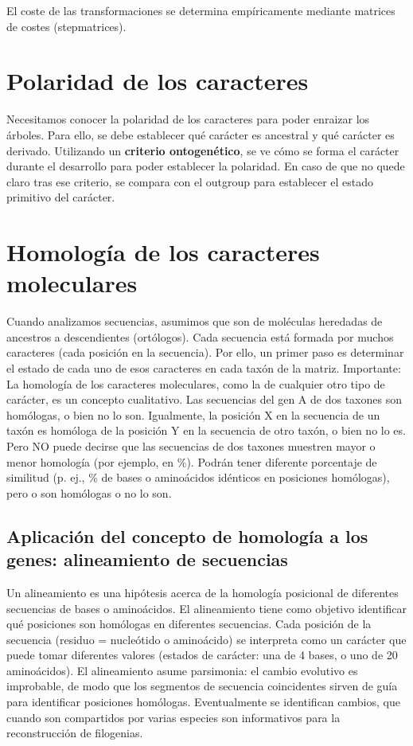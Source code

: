 El coste de las transformaciones se determina empíricamente mediante matrices de costes (stepmatrices). 

\section{Polaridad de los caracteres}
Necesitamos conocer la polaridad de los caracteres para poder enraizar los árboles. Para ello, se debe establecer qué carácter es ancestral y qué carácter es derivado. Utilizando un \textbf{criterio ontogenético}, se ve cómo se forma el carácter durante el desarrollo para poder establecer la polaridad. En caso de que no quede claro tras ese criterio, se compara con el outgroup para establecer el estado primitivo del carácter. 

\section{Homología de los caracteres moleculares}
Cuando analizamos secuencias, asumimos que son de moléculas heredadas de ancestros a descendientes (ortólogos). Cada secuencia está formada por muchos caracteres (cada posición en la secuencia). Por ello, un primer paso es determinar el estado de cada uno de esos caracteres en cada taxón de la matriz. Importante: La homología de los caracteres moleculares, como la de cualquier otro tipo de carácter, es un concepto cualitativo. Las secuencias del gen A de dos taxones son homólogas, o bien no lo son. Igualmente, la posición X en la secuencia de un taxón es homóloga de la posición Y en la secuencia de otro taxón, o bien no lo es. Pero NO puede decirse que las secuencias de dos taxones muestren mayor o menor homología (por ejemplo, en \%). Podrán tener diferente porcentaje de similitud (p. ej., \% de bases o aminoácidos idénticos en posiciones homólogas), pero o son homólogas o no lo son.

\subsection{Aplicación del concepto de homología a los genes: alineamiento de secuencias}
Un alineamiento es una hipótesis acerca de la homología posicional de diferentes secuencias de bases o aminoácidos. El alineamiento tiene como objetivo identificar qué posiciones son homólogas en diferentes secuencias. Cada posición de la secuencia (residuo = nucleótido o aminoácido) se interpreta como un carácter que puede tomar diferentes valores (estados de carácter: una de 4 bases, o uno de 20 aminoácidos). El alineamiento asume parsimonia: el cambio evolutivo es improbable, de modo que los segmentos de secuencia coincidentes sirven de guía para identificar posiciones homólogas. Eventualmente se identifican cambios, que cuando son compartidos por varias especies son informativos para la reconstrucción de filogenias.


